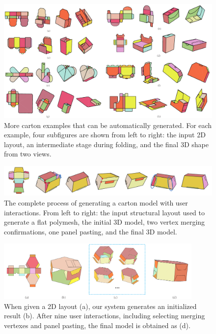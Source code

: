 

\begin{figure}
	\centering
	\includegraphics[width=\textwidth]{images/moreAutomatic}
	\caption{More carton examples that can be automatically generated. For each example, four subfigures are shown from left to right: the input 2D layout, an intermediate stage during folding, and the final 3D shape from two views.}  
	\label{fig:automatic-more}
	
\end{figure}


\begin{figure}
	\centering
	\includegraphics[width=\textwidth]{images/105}
	\caption{The complete process of generating a carton model with user interactions. From left to right: the input structural layout used to generate a flat polymesh, the initial 3D model, two vertex merging confirmations, one panel pasting, and the final 3D model.}
	\label{fig:result}
\end{figure}

\begin{figure}
	\centering
	\includegraphics[width=0.9\textwidth]{images/limitation}
	\caption{When given a 2D layout (a), our system generates an initialized result (b). After nine user interactions, including selecting merging vertexes and panel pasting, the final model is obtained as (d). }
	\label{fig:hexagon}
\end{figure}

